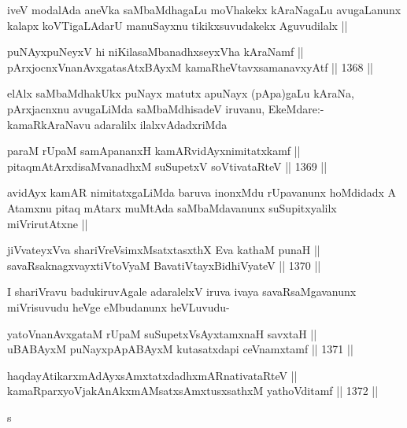 \begin{artha}
iveV modalAda aneVka saMbaMdhagaLu moVhakekx kAraNagaLu avugaLanunx kalapx koVTigaLAdarU manuSayxnu tikikxsuvudakekx Aguvudilalx ||
\end{artha}

\begin{shl}
puNAyxpuNeyxV hi niKilasaMbanadhxseyxVha kAraNamf || \\
pArxjocnxV\s nanAvxgatasAtxBAyxM kamaRheVtavxsamanavxyAtf ||  1368 ||  
\end{shl}

\begin{artha}
elAlx saMbaMdhakUkx puNayx matutx apuNayx (pApa)gaLu kAraNa, pArxjacnxnu avugaLiMda saMbaMdhisadeV iruvanu, EkeMdare:- kamaRkAraNavu adaralilx ilalxvAdadxriMda
\end{artha}

\begin{shl}
paraM rUpaM samApananxH kamARvidAyxnimitatxkamf || \\
pitaqmAtArxdisaMvanadhxM suSupetxV soV\s tivataRteV ||  1369 ||  
\end{shl}

\begin{artha}
avidAyx kamAR nimitatxgaLiMda baruva inonxMdu rUpavanunx hoMdidadx A Atamxnu pitaq mAtarx muMtAda saMbaMdavanunx suSupitxyalilx miVrirutAtxne ||
\end{artha}


\begin{shl}
jiVvateyxVva shariVreV\s simxMsatxtasxthX Eva kathaM punaH ||  \\
savaRsaknagxvayxtiVtoV\s yaM BavatiVtayxBidhiVyateV ||  1370 ||  
\end{shl}

\begin{artha}
I shariVravu badukiruvAgale adaralelxV iruva ivaya savaRsaMgavanunx miVrisuvudu heVge eMbudanunx heVLuvudu-
\end{artha}


\begin{shl}
yatoV\s nanAvxgataM rUpaM suSupetxV\s sAyx\s \s tamxnaH savxtaH || \\
uBABAyxM puNayxpApABAyxM kutasatxdapi ceVnamxtamf ||  1371 ||  
\end{shl}
				
\begin{shl}
haqdayAtikarxmAdAyxsAmxtatxdadhxmARnativataRteV || \\
kamaRparxyoVjakAnAkxmAMsatxsAmxtusxsathxM yathoVditamf ||  1372 ||  
\end{shl}s

